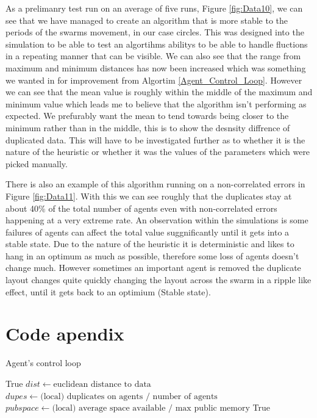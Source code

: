 \documentclass{UoYCSproject}
\begin{document}
As a prelimanry test run on an average of five runs, Figure \ref{fig:Data10}, we can see that we have managed to create an algorithm that is more stable to the periods of the swarms movement, in our case circles.
This was designed into the simulation to be able to test an algortihms abilitys to be able to handle fluctions in a repeating manner that can be visible.
We can also see that the range from maximum and minimum distances has now been increased which was something we wanted in for improvement from Algortim \ref{Agent_Control_Loop}.
However we can see that the mean value is roughly within the middle of the maximum and minimum value which leads me to believe that the algorithm isn't performing as expected.
We prefurably want the mean to tend towards being closer to the minimum rather than in the middle, this is to show the desnsity diffrence of duplicated data.
This will have to be investigated further as to whether it is the nature of the heuristic or whether it was the values of the parameters which were picked manually.

There is also an example of this algorithm running on a non-correlated errors in Figure \ref{fig:Data11}.
With this we can see roughly that the duplicates stay at about 40\% of the total number of agents even with non-correlated errors happening at a very extreme rate.
An observation within the simulations is some failures of agents can affect the total value suggnificantly until it gets into a stable state.
Due to the nature of the heuristic it is deterministic and likes to hang in an optimum as much as possible, therefore some loss of agents doesn't change much.
However sometimes an important agent is removed the duplicate layout changes quite quickly changing the layout across the swarm in a ripple like effect, until it gets back to an optimium (Stable state).






\appendix
\chapter{Code apendix}

\begin{algorithm}
\caption{Agent's control loop}
\label{Agent_Control_Loop2}
\begin{algorithmic}[1]
\State {}
\State
{}
\State {}
\State \Return True
\EndIf
\State
\State $dist \gets \text{euclidean distance to data}$
\State $dupes \gets \text{(local) duplicates on agents / number of agents}$
\State $pub space \gets \text{(local) average space available / max public memory}$
\State
{}
\State {}
\EndIf
\State
{}
\State {}
\EndIf
\State
\State {}
\State
\State \Return True
\EndProcedure
\end{algorithmic}
\end{algorithm}
\end{document}
